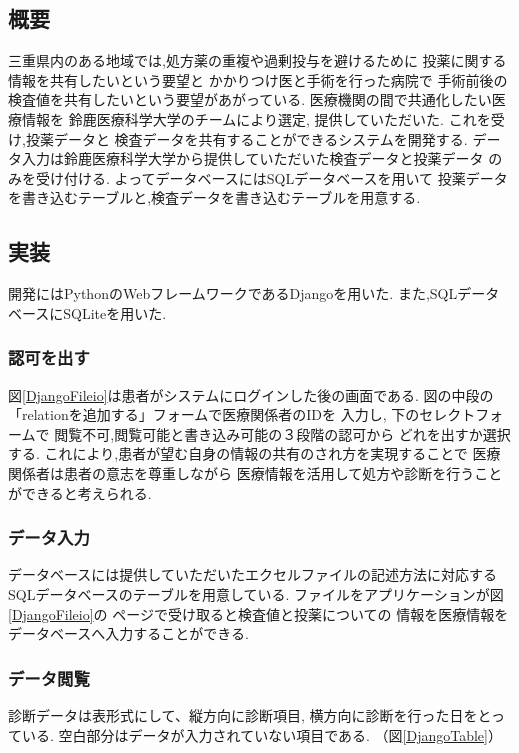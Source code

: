 \subsection{概要}
三重県内のある地域では,処方薬の重複や過剰投与を避けるために
投薬に関する情報を共有したいという要望と
かかりつけ医と手術を行った病院で
手術前後の検査値を共有したいという要望があがっている.
医療機関の間で共通化したい医療情報を
鈴鹿医療科学大学のチームにより選定,
提供していただいた.
これを受け,投薬データと
検査データを共有することができるシステムを開発する.
データ入力は鈴鹿医療科学大学から提供していただいた検査データと投薬データ
のみを受け付ける.
よってデータベースにはSQLデータベースを用いて
投薬データを書き込むテーブルと,検査データを書き込むテーブルを用意する.

\subsection{実装}
  開発にはPythonのWebフレームワークであるDjangoを用いた.
  また,SQLデータベースにSQLiteを用いた.\cite{bibi8}

  \subsubsection{認可を出す}
    図\ref{DjangoFileio}は患者がシステムにログインした後の画面である.
    図の中段の「relationを追加する」フォームで医療関係者のIDを
    入力し,
    下のセレクトフォームで
    閲覧不可,閲覧可能と書き込み可能の３段階の認可から
    どれを出すか選択する.
    これにより,患者が望む自身の情報の共有のされ方を実現することで
    医療関係者は患者の意志を尊重しながら
    医療情報を活用して処方や診断を行うことができると考えられる.



  \subsubsection{データ入力}
    データベースには提供していただいたエクセルファイルの記述方法に対応する
    SQLデータベースのテーブルを用意している.
    ファイルをアプリケーションが図\ref{DjangoFileio}の
    ページで受け取ると検査値と投薬についての
    情報を医療情報をデータベースへ入力することができる.

  \subsubsection{データ閲覧}
    診断データは表形式にして、縦方向に診断項目,
    横方向に診断を行った日をとっている.
    空白部分はデータが入力されていない項目である.
    （図\ref{DjangoTable}）


